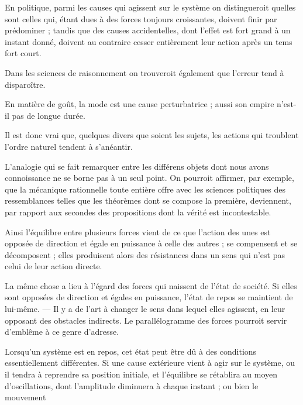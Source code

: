 \documentclass[11pt,a4paper]{article}
\begin{document}
En politique, parmi les causes qui agissent sur le système on
distingueroit quelles
sont celles qui, étant dues à des forces toujours croissantes, doivent finir
par prédominer ; tandis que des causes accidentelles, dont l'effet est fort
grand à un instant donné, doivent au contraire cesser entièrement leur
action après un tems fort court.

Dans les sciences de raisonnement on trouveroit également que l'erreur tend
à disparoître.

En matière de goût, la mode est une cause perturbatrice ; aussi son empire
n'est-il pas de longue durée.

Il est donc vrai que, quelques divers que soient les sujets, les actions qui
troublent l'ordre naturel tendent à s'anéantir.

L'analogie qui se fait remarquer  entre les différens objets
dont nous avons connoissance ne se borne pas à un seul point. On pourroit
affirmer, par exemple, que la mécanique rationnelle toute entière offre avec
les sciences politiques des ressemblances telles que les théorèmes dont se
compose la première,  deviennent, par rapport aux secondes des
propositions dont la vérité est incontestable.

Ainsi
 l'équilibre entre plusieurs forces vient de ce que
l'action des unes est opposée de direction et égale en puissance à celle des
autres ;
 se compensent et se décomposent ; elles produisent alors des
résistances dans un sens qui n'est pas celui de leur action directe.

La même chose a lieu à l'égard des forces qui  naissent de
l'état de société. Si elles sont opposées de direction et égales en
puissance, l'état de repos se maintient de lui-même. --- Il y a de l'art à
changer le sens dans lequel elles agissent,  en leur
opposant des obstacles
indirects. Le parallélogramme des forces pourroit servir d'emblême à ce
genre d'adresse.

Lorsqu'un système est en repos, cet état peut être dû à des conditions
essentiellement différentes. Si une cause extérieure vient à agir sur le
système, ou il tendra à reprendre sa position initiale, et
 l'équilibre se rétablira au moyen d'oscillations, dont
l'amplitude diminuera à chaque instant ; ou bien le mouvement
\end{document}
